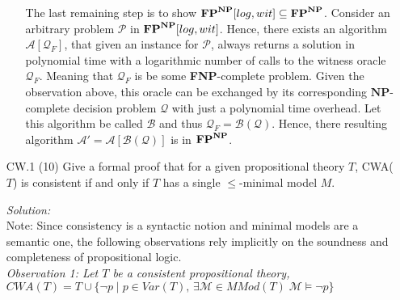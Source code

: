 \documentclass[11pt,a4paper]{article}
\newcommand{\NP}{\ensuremath{\mathbf{NP}}\xspace}
\newcommand{\FPol}{\ensuremath{\protect\mathbf{FP}}\xspace}
\newcommand{\FPNP}{\ensuremath{\FPol^{\NP}}\xspace}
\newcommand{\FPNPlogwit}{\ensuremath{\FPol^{\NP}[log, wit]}\xspace}
\begin{document}
\begin{enumerate}
\begin{enumerate}[(a)]
 The last remaining step is to show $\FPNPlogwit  \subseteq  \FPNP$. Consider an arbitrary problem $\mathcal{P}$ in \FPNPlogwit . Hence, there exists an algorithm $\mathcal{A}[\mathcal{Q}_F]$, that given an instance for $\mathcal{P}$, always returns a solution in polynomial time with a logarithmic number of calls to the witness oracle $\mathcal{Q}_F$. Meaning that $\mathcal{Q}_F$ is be some \textbf{FNP}-complete problem. Given the observation above, this oracle can be exchanged by its corresponding \NP-complete decision problem $\mathcal{Q}$ with just a polynomial time overhead. Let this algorithm be called $\mathcal{B}$ and thus $\mathcal{Q}_F= \mathcal{B}(\mathcal{Q})$. Hence, there resulting algorithm $\mathcal{A}'=\mathcal{A}[\mathcal{B}(\mathcal{Q})]$ is in \FPNP. \\
 

\end{enumerate}
            
            

\newpage
            
\item[CW.1] (10) Give a formal proof that for a given propositional theory $T$,
CWA($T$) is consistent if and only if $T$ has a single  $\leq$-minimal model $M$. 

\bigskip

\emph{Solution:}\\

Note: Since consistency is a syntactic notion and minimal models are a semantic one, the following observations rely implicitly on the soundness and completeness of propositional logic.\\

\emph{Observation 1: Let $T$ be a consistent propositional theory, $\mathit{CWA}(T)= T \cup \{ \neg p \mid p \in \mathit{Var}(T) , \,\exists \mathcal{M} \in \mathit{MMod}(T) \; \mathcal{M} \models \neg p \}$ }



\end{enumerate}
\end{document}
